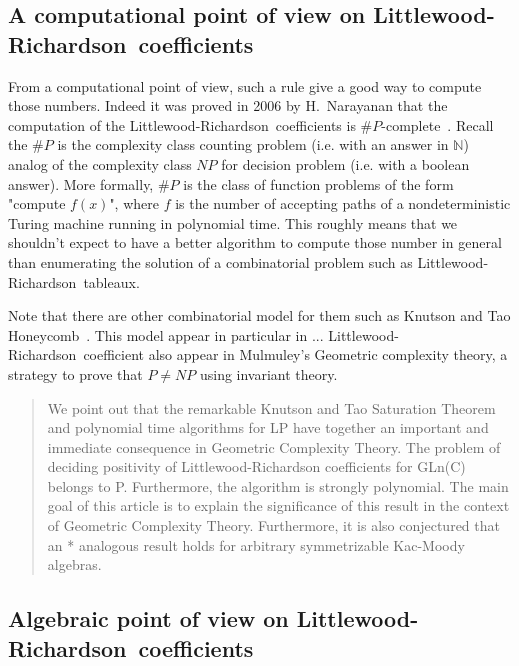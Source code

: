 \documentclass[12pt,a4paper]{article}
\newcommand{\LR}{Littlewood-Richardson\ }
\newcommand{\N}{{\mathbb N}}
\begin{document}
\subsection{A computational point of view on \LR coefficients}

From a computational point of view, such a rule give a good way to compute
those numbers. Indeed it was proved in 2006 by H.~Narayanan that the
computation of the \LR coefficients is
$\#P$-complete~\cite{Narayanan06}. Recall the $\#P$ is the complexity class
counting problem (i.e. with an answer in $\N$) analog of the complexity class
$NP$ for decision problem (i.e. with a boolean answer). More formally, $\#P$
is the class of function problems of the form "compute $f(x)$", where $f$ is
the number of accepting paths of a nondeterministic Turing machine running in
polynomial time. This roughly means that we shouldn't expect to have a better
algorithm to compute those number in general than enumerating the solution of
a combinatorial problem such as \LR tableaux. 

Note that there are other combinatorial model for them such as Knutson and Tao
Honeycomb~\cite{KnutsonTao}. This model appear in particular in ...
\LR coefficient
also appear in Mulmuley's Geometric complexity theory, a strategy to prove
that $P\neq NP$ using invariant theory.

\begin{quotation}
  We point out that the remarkable Knutson and Tao Saturation Theorem and
  polynomial time algorithms for LP have together an important and immediate
  consequence in Geometric Complexity Theory. The problem of deciding
  positivity of Littlewood-Richardson coefficients for GLn(C) belongs to
  P. Furthermore, the algorithm is strongly polynomial.  The main goal of this
  article is to explain the significance of this result in the context of
  Geometric Complexity Theory. Furthermore, it is also conjectured that an
*  analogous result holds for arbitrary symmetrizable Kac-Moody algebras.
\end{quotation}

\subsection{Algebraic point of view on \LR coefficients}
\end{document}
